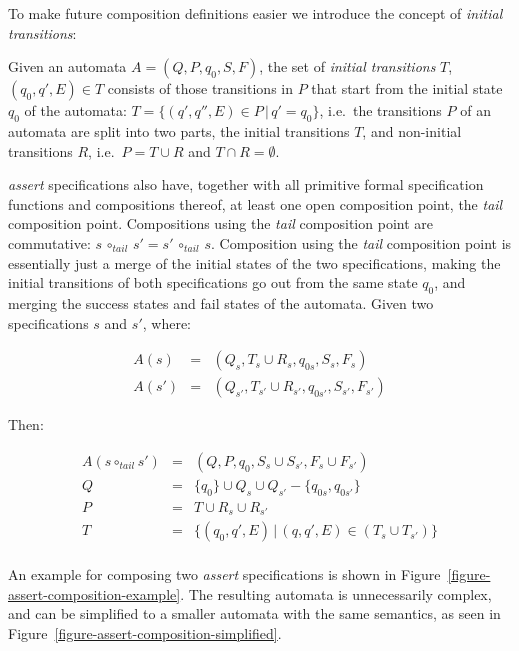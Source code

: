 To make future composition definitions easier we introduce the concept of
\textit{initial transitions}:

\begin{mydef}\label{def-initial-transitions}
Given an automata $A = (Q, P, q_0, S, F)$, the set of \textit{initial
transitions} $T$, $(q_0, q', E) \in T$ consists of those transitions in $P$
that start from the initial state $q_0$ of the automata: $T = \{(q', q'', E)
\in P \, | \, q' = q_0 \}$, i.e.\ the transitions $P$ of an automata are split
into two parts, the initial transitions $T$, and non-initial transitions $R$,
i.e.\ $P = T \cup R$ and $T \cap R = \emptyset$.
\end{mydef}

\textit{assert} specifications also have, together with all primitive formal
specification functions and compositions thereof, at least one open composition
point, the \textit{tail} composition point. Compositions using the
\textit{tail} composition point are commutative: $s \, \circ_{tail} \, s' = s'
\, \circ_{tail} \, s$. Composition using the \textit{tail} composition point
is essentially just a merge of the initial states of the two specifications,
making the initial transitions of both specifications go out from the same
state $q_0$, and merging the success states and fail states of the automata.
Given two specifications $s$ and $s'$, where:

\medskip
\[
  \begin{array}{rcl}
    A(s) & = & (Q_s, T_s \cup R_s, q_{0s}, S_s, F_s) \\
   A(s') & = & (Q_{s'}, T_{s'} \cup R_{s'}, q_{0s'}, S_{s'}, F_{s'})
  \end{array}
\]
\medskip

Then:

\medskip
\[
  \begin{array}{rcl}
    A(s \circ_{tail} s') & = & (Q, P, q_0, S_s \cup S_{s'}, F_s \cup F_{s'}) \\
                       Q & = & \{q_0\} \cup Q_s \cup Q_{s'} - \{q_{0s}, q_{0s'}\} \\
                       P & = & T \cup R_s \cup R_{s'} \\
                       T & = & \{(q_0, q', E) \, | \, (q, q', E) \in (T_s \cup T_{s'})\} \\
  \end{array}
\]
\medskip

An example for composing two \textit{assert} specifications is shown in
Figure~\ref{figure-assert-composition-example}. The resulting automata is
unnecessarily complex, and can be simplified to a smaller automata with the
same semantics, as seen in Figure~\ref{figure-assert-composition-simplified}.


